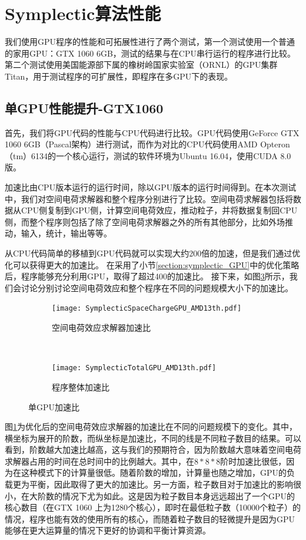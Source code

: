 \section{Symplectic算法性能}      \label{section:Symplectic_performance}
我们使用GPU程序的性能和可拓展性进行了两个测试，第一个测试使用一个普通的家用GPU：GTX 1060 6GB，测试的结果与在CPU串行运行的程序进行比较。第二个测试使用美国能源部下属的橡树岭国家实验室（ORNL）的GPU集群Titan，用于测试程序的可扩展性，即程序在多GPU下的表现。

\subsection{单GPU性能提升-GTX1060}
首先，我们将GPU代码的性能与CPU代码进行比较。GPU代码使用GeForce GTX 1060 6GB（Pascal架构）进行测试，而作为对比的CPU代码使用AMD Opteron（tm）6134的一个核心运行，测试的软件环境为Ubuntu 16.04，使用CUDA 8.0版。

加速比由CPU版本运行的运行时间，除以GPU版本的运行时间得到。在本次测试中，我们对空间电荷求解器和整个程序分别进行了比较。空间电荷求解器包括将数据从CPU侧复制到GPU侧，计算空间电荷效应，推动粒子，并将数据复制回CPU侧，而整个程序则包括了除了空间电荷求解器之外的所有其他部分，比如外场推动，输入，统计，输出等等。

从CPU代码简单的移植到GPU代码就可以实现大约200倍的加速，但是我们通过优化可以获得更大的加速比。
在采用了小节\ref{section:symplectic_GPU}中的优化策略后，程序能够充分利用GPU，取得了超过400的加速比。
接下来，如图\ref{fig:OneGPU}所示，我们会讨论分别讨论空间电荷效应和整个程序在不同的问题规模大小下的加速比。

\begin{figure}[!htb]
    \centering
    \begin{subfigure}[b]{0.9\textwidth}
        \texttt{[image: SymplecticSpaceChargeGPU\_AMD13th.pdf]}
        \caption{空间电荷效应求解器加速比}
        \label{fig:SCOpt}
    \end{subfigure}
    \quad
    ~ %
    \begin{subfigure}[b]{0.9\textwidth}
        \texttt{[image: SymplecticTotalGPU\_AMD13th.pdf]}
        \caption{程序整体加速比}
        \label{fig:TotalOpt}
    \end{subfigure}
    \caption{单GPU加速比}\label{fig:OneGPU}
\end{figure}

图\ref{fig:SCOpt}为优化后的空间电荷效应求解器的加速比在不同的问题规模下的变化。其中，横坐标为展开的阶数，而纵坐标是加速比，不同的线是不同粒子数目的结果。可以看到，阶数越大加速比越高，这与我们的预期符合，因为阶数越大意味着空间电荷求解器占用的时间在总时间中的比例越大。其中，在$8*8*8$阶时加速比很低，因为在这种模式下的计算量很低。随着阶数的增加，计算量也随之增加，GPU的负载更为平衡，因此取得了更大的加速比。另一方面，粒子数目对于加速比的影响很小，在大阶数的情况下尤为如此。这是因为粒子数目本身远远超出了一个GPU的核心数目（在GTX 1060 上为1280个核心），即时在最低粒子数（10000个粒子）的情况，程序也能有效的使用所有的核心，而随着粒子数目的轻微提升是因为GPU能够在更大运算量的情况下更好的协调和平衡计算资源。

